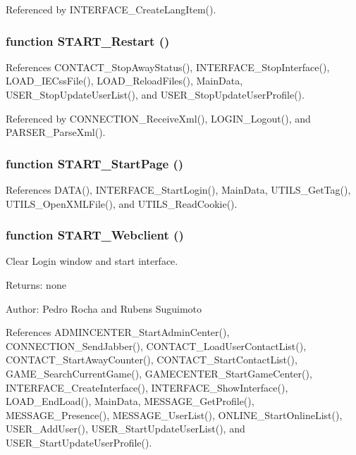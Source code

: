 Referenced by INTERFACE\_\-CreateLangItem().
\subsubsection[START\_\-Restart]{\setlength{\rightskip}{0pt plus 5cm}function START\_\-Restart ()}\label{start_8js_36fd0c258d7df562702d2e68eba4dabb}




References CONTACT\_\-StopAwayStatus(), INTERFACE\_\-StopInterface(), LOAD\_\-IECssFile(), LOAD\_\-ReloadFiles(), MainData, USER\_\-StopUpdateUserList(), and USER\_\-StopUpdateUserProfile().

Referenced by CONNECTION\_\-ReceiveXml(), LOGIN\_\-Logout(), and PARSER\_\-ParseXml().
\subsubsection[START\_\-StartPage]{\setlength{\rightskip}{0pt plus 5cm}function START\_\-StartPage ()}\label{start_8js_fe03f5d8f997138001a342d01348b971}




References DATA(), INTERFACE\_\-StartLogin(), MainData, UTILS\_\-GetTag(), UTILS\_\-OpenXMLFile(), and UTILS\_\-ReadCookie().
\subsubsection[START\_\-Webclient]{\setlength{\rightskip}{0pt plus 5cm}function START\_\-Webclient ()}\label{start_8js_f49d704e6b35d240e8d0c89251a6e7c4}


Clear Login window and start interface. 

\begin{Desc}
\item[Returns:]none \end{Desc}
\begin{Desc}
\item[Author:]Pedro Rocha and Rubens Suguimoto \end{Desc}


References ADMINCENTER\_\-StartAdminCenter(), CONNECTION\_\-SendJabber(), CONTACT\_\-LoadUserContactList(), CONTACT\_\-StartAwayCounter(), CONTACT\_\-StartContactList(), GAME\_\-SearchCurrentGame(), GAMECENTER\_\-StartGameCenter(), INTERFACE\_\-CreateInterface(), INTERFACE\_\-ShowInterface(), LOAD\_\-EndLoad(), MainData, MESSAGE\_\-GetProfile(), MESSAGE\_\-Presence(), MESSAGE\_\-UserList(), ONLINE\_\-StartOnlineList(), USER\_\-AddUser(), USER\_\-StartUpdateUserList(), and USER\_\-StartUpdateUserProfile().

